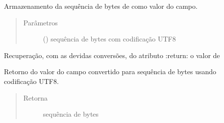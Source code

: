 \documentclass[letterpaper,10pt,brazil]{sphinxmanual}
\begin{document}
\begin{fulllineitems}
\begin{fulllineitems}
\label{\detokenize{index:estrutarq.campo.campo_cadeia.CampoCadeiaBasico.bytes_para_valor}}
\pysigstartsignatures
{}
\pysigstopsignatures
\sphinxAtStartPar
Armazenamento da sequência de bytes de  como valor
do campo.
\begin{quote}\begin{description}
\item[{Parâmetros}] \leavevmode
\sphinxAtStartPar
{} () \textendash{} sequência de bytes com codificação UTF\sphinxhyphen{}8

\end{description}\end{quote}

\end{fulllineitems}


\begin{fulllineitems}
\label{\detokenize{index:estrutarq.campo.campo_cadeia.CampoCadeiaBasico.valor}}
\pysigstartsignatures
{}
\pysigstopsignatures
\sphinxAtStartPar
Recuperação, com as devidas conversões, do atributo 
:return: o valor de 

\end{fulllineitems}


\begin{fulllineitems}
\label{\detokenize{index:estrutarq.campo.campo_cadeia.CampoCadeiaBasico.valor_para_bytes}}
\pysigstartsignatures
{}
\pysigstopsignatures
\sphinxAtStartPar
Retorno do valor do campo convertido para sequência
de bytes usando codificação UTF\sphinxhyphen{}8.
\begin{quote}\begin{description}
\item[{Retorna}] \leavevmode
\sphinxAtStartPar
sequência de bytes


\end{description}
\end{quote}
\end{fulllineitems}
\end{fulllineitems}
\end{document}
